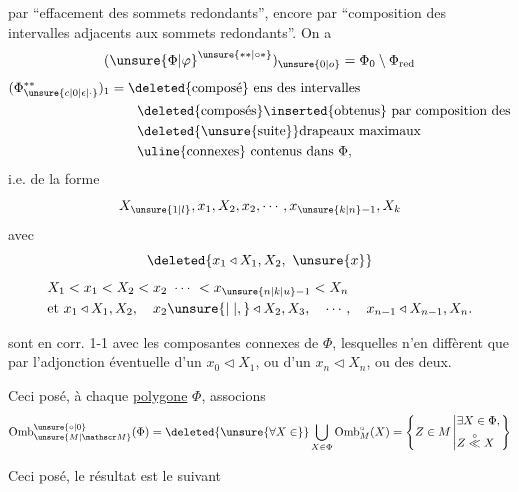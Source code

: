 par ``effacement des sommets redondants'',  encore par ``composition des  intervalles adjacents aux sommets redondants''. On a
\[
({\unsure{\Phi|\varphi}}^{\unsure{**|\circ *}})_{\unsure{0|o}}=\Phi_0\setminus\Phi_{\mathrm{red}}
\]
\[
\begin{aligned}
(\Phi_{\unsure{c|0|\epsilon|\cdot}}^{**})_1&=\deleted{\text{composé}}\text{ ens des intervalles}\\
&\qquad\deleted{\text{composés}}\inserted{\text{obtenus}}\text{ par composition des}\\
&\qquad\deleted{\text{\unsure{suite}}}\text{drapeaux maximaux}\\
&\qquad\uline{\text{connexes}}\text{ contenus dans }\Phi,
\end{aligned}
\]
i.e. de la forme
\[
X_{\unsure{1|l}},x_1,X_2,x_2,\cdots,x_{\unsure{k|n}-1},X_k
\]
avec
\[
\deleted{x_1\triangleleft X_1,X_2,\ \unsure{x}}
\]
\[
\begin{aligned}
&X_1<x_1<X_2<x_2\ \cdots\ <x_{\unsure{n|k|u}-1}<X_n\\
&\text{et }x_1\triangleleft X_1,X_2,\quad x_2\unsure{\mid|,}\triangleleft X_2,X_3,\quad\cdots,\quad x_{n-1}\triangleleft X_{n-1},X_n.
\end{aligned}
\]

 sont en corr. 1-1 avec les composantes connexes de $\Phi$, lesquelles n'en diffèrent que par l'adjonction éventuelle d'un $x_0\triangleleft X_1$, ou d'un $x_n\triangleleft X_n$, ou des deux.

 Ceci posé, à chaque \uline{polygone} $\Phi$, associons
\[
\operatorname{Omb}^{\unsure{\circ|0}}_{\unsure{M|\mathscr M}}(\Phi)=\deleted{\unsure{\forall X\in}}\bigcup_{X\in\Phi}\operatorname{Omb}^{\circ}_M(X)
=\left\{Z\in M\left|\begin{aligned}&\exists X\in\Phi,\\&Z\overset{\circ}{\ll}X\end{aligned}\right.\right\}
\]

Ceci posé, le résultat  est le suivant
